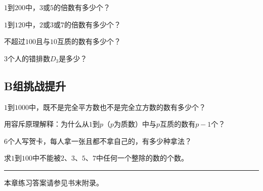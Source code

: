 \begin{exercise}
\item $1$到$200$中，$3$或$5$的倍数有多少个？
\item $1$到$120$中，$2$或$3$或$7$的倍数有多少个？
\item 不超过$100$且与$10$互质的数有多少个？
\item $3$个人的错排数$D_3$是多少？
\end{exercise}

\subsection*{B组\quad 挑战提升}

\begin{exercise}
\item $1$到$1000$中，既不是完全平方数也不是完全立方数的数有多少个？
\item 用容斥原理解释：为什么从$1$到$p$（$p$为质数）中与$p$互质的数有$p-1$个？
\item $6$个人写贺卡，每人拿一张且都不拿自己的，有多少种拿法？
\item 求$1$到$100$中不能被$2$、$3$、$5$、$7$中任何一个整除的数的个数。
\end{exercise}

\vfill
\noindent\rule{\textwidth}{0.4pt}
本章练习答案请参见书末附录。
